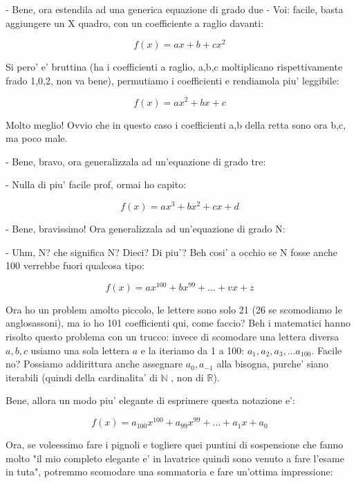 - Bene, ora estendila ad una generica equazione di grado due
- Voi: facile, basta aggiungere un X quadro, con un coefficiente a raglio davanti:

\begin{equation}
  f(x)= a x + b + c x^2
\end{equation}

Si pero' e' bruttina (ha i coefficienti a raglio, a,b,c moltiplicano rispettivamente frado 1,0,2, non va bene),
permutiamo i coefficienti e rendiamola piu' leggibile:

\begin{equation}
  f(x)= a x^2 + b x + c
\end{equation}

Molto meglio! Ovvio che in questo caso i coefficienti a,b della retta sono ora b,c, ma poco male.

- Bene, bravo, ora generalizzala ad un'equazione di grado tre:

- Nulla di piu' facile prof, ormai ho capito:

\begin{equation}
  f(x)= a x^3 + b x^2 + cx + d
\end{equation}

- Bene, bravissimo! Ora generalizzala ad un'equazione di grado N:

- Uhm, N? che significa N? Dieci? Di piu'? Beh cosi' a occhio se N fosse anche 100 verrebbe fuori qualcosa tipo:

\begin{equation}
  f(x)= a x^100 + b x^99 + ... + v x + z
\end{equation}

Ora ho un problem amolto piccolo, le lettere sono solo 21 (26 se scomodiamo le anglosassoni), ma io ho 101 coefficienti qui,
come faccio? Beh i matematici hanno risolto questo problema con un trucco: invece di scomodare una lettera diversa $a,b,c$ 
usiamo una sola lettera $a$ e la iteriamo da 1 a 100: $ a_1, a_2, a_3, ... a_100 $. Facile no? Possiamo addirittura anche
assegnare $ a_0, a_{-1} $ alla bisogna, purche' siano iterabili (quindi della cardinalita' di $\mathbb{N}$ , non di $\mathbb{R}$). 

Bene, allora un modo piu' elegante di esprimere questa notazione e': 

\begin{equation}
  f(x)= a_100 x^100 + a_99 x^99 + ... + a_1 x + a_0
\end{equation}

Ora, se voleessimo fare i pignoli e togliere quei puntini di sospensione che fanno molto "il mio completo elegante e'
in lavatrice quindi sono venuto a fare l'esame in tuta", potremmo scomodare una sommatoria e fare un'ottima impressione: 

